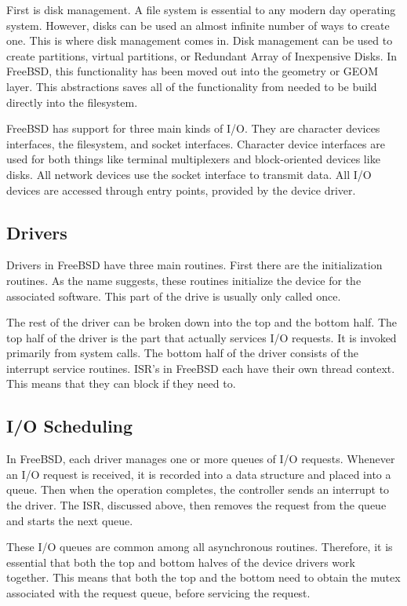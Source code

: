 \documentclass[letterpaper,10pt,titlepage,draftclsnofoot,onecolumn]{IEEEtran}
\begin{document}
First is disk management. A file system is essential to any modern day operating system. However, disks can be used an almost infinite number of ways to create one. This is where disk management comes in. Disk management can be used to create partitions, virtual partitions, or Redundant Array of Inexpensive Disks. In FreeBSD, this functionality has been moved out into the geometry or GEOM layer. This abstractions saves all of the functionality from needed to be build directly into the filesystem. \cite{freebsd}

FreeBSD has support for three main kinds of I/O. They are character devices interfaces, the filesystem, and socket interfaces. Character device interfaces are used for both things like terminal multiplexers and block-oriented devices like disks. All network devices use the socket interface to transmit data. All I/O devices are accessed through entry points, provided by the device driver.

\subsection{Drivers}
Drivers in FreeBSD have three main routines. First there are the initialization routines. As the name suggests, these routines initialize the device for the associated software. This part of the drive is usually only called once. 

The rest of the driver can be broken down into the top and the bottom half. The top half of the driver is the part that actually services I/O requests. It is invoked primarily from system calls. The bottom half of the driver consists of the interrupt service routines. ISR's in FreeBSD each have their own thread context. \cite{freebsd} This means that they can block if they need to. 

\subsection{I/O Scheduling}
In FreeBSD, each driver manages one or more queues of I/O requests. Whenever an I/O request is received, it is recorded into a data structure and placed into a queue. Then when the operation completes, the controller sends an interrupt to the driver. The ISR, discussed above, then removes the request from  the queue and starts the next queue. \cite{freebsd}

These I/O queues are common among all asynchronous routines. Therefore, it is essential that both the top and bottom halves of the device drivers work together. This means that both the top and the bottom need to obtain the mutex associated with the request queue, before servicing the request. \cite{freebsd}
\end{document}
